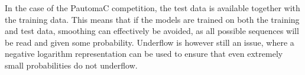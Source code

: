 In the case of the PautomaC competition, the test data is available together with the training data. This means that if the models are trained on both the training and test data, smoothing can effectively be avoided, as all possible sequences will be read and given some probability. Underflow is however still an issue, where a negative logarithm representation can be used to ensure that even extremely small probabilities do not underflow.
	
